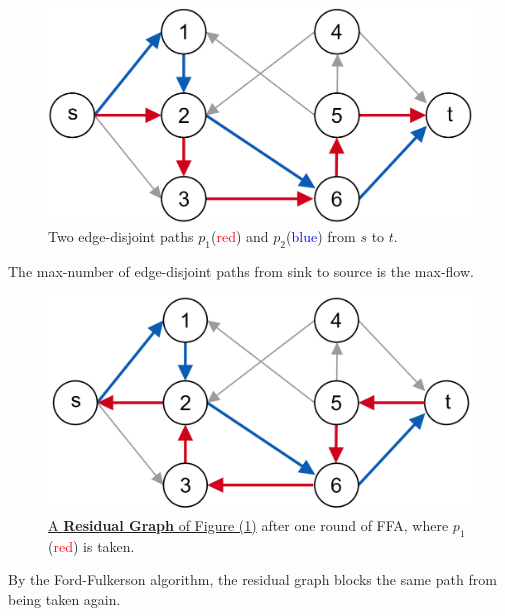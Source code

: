 \vspace{-.5em}
\begin{figure}[h]
    \centering
    \includegraphics[width=.4\textwidth]{Sections/net/dis.png}
    \caption{Two edge-disjoint paths $p_1$(\textcolor{red}{red}) and $p_2$(\textcolor{blue}{blue}) from $s$ to $t$.}
    \label{fig:dis}
\end{figure}

\vspace{-.5em}
\begin{theo}

    The max-number of edge-disjoint paths from sink to source is the max-flow.
\end{theo}

\vspace{-1em}
\begin{figure}[h]
    \centering
    \includegraphics[width=.4\textwidth]{Sections/net/resdis.png}
    \caption{\underline{A \textbf{Residual Graph} of Figure (\ref{fig:dis})} after one round of FFA, where $p_1$(\textcolor{red}{red}) is taken.}
\end{figure}

\noindent
By the Ford-Fulkerson algorithm, the residual graph blocks the same path from being taken again.










